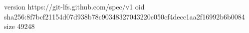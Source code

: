 version https://git-lfs.github.com/spec/v1
oid sha256:8f7bcf21154d07d938b78c90348327043220c050cf4decc1aa2f16992b6b0084
size 49248
